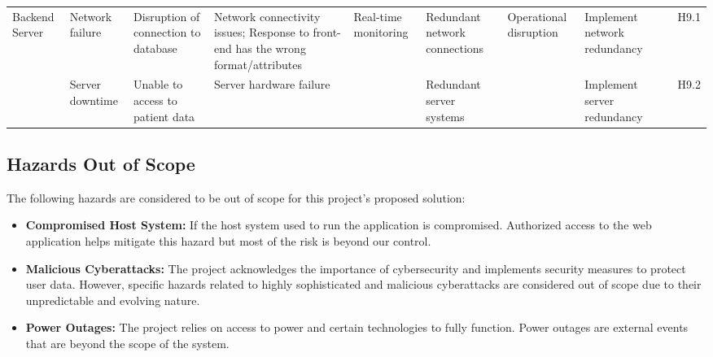 \documentclass{article}
\begin{document}
\begin{landscape}
\begin{table}[hp]
\begin{footnotesize}
\begin{tabular}{|p{1in}|p{1in}|p{1in}|p{1.5in}|p{0.6in}|p{0.5in}|p{0.3in}|p{2.5in}|p{0.2in}|p{0.2in}|}
        
        
        \hline 
        \multirow{2}{1in}{Backend Server} & Network failure & Disruption of connection to database & Network connectivity issues; Response to front-end has the wrong format/attributes & \multirow{2}{0.6in}{Real-time monitoring} & Redundant network connections & \multirow{2}{0.2in}{Operational disruption} & Implement network redundancy & & H9.1 \\
        \cline{2-4}\cline{6-6}\cline{8-8}\cline{10-10}
        & Server downtime & Unable to access to patient data & Server hardware failure & & Redundant server systems & & Implement server redundancy & & H9.2 \\
        \bottomrule
    \end{tabular}
    \end{footnotesize}
\end{table}
\end{landscape}
\restoregeometry

\subsection{Hazards Out of Scope}
The following hazards are considered to be out of scope for this project's proposed solution:
\begin{itemize}
    \item \textbf{Compromised Host System:} If the host system used to run the application is compromised. Authorized access to the web application helps mitigate this hazard but most of the risk is beyond our control.
    \item \textbf{Malicious Cyberattacks:} The project acknowledges the importance of cybersecurity and implements security measures to protect user data. However, specific hazards related to highly sophisticated and malicious cyberattacks are considered out of scope due to their unpredictable and evolving nature.
    \item \textbf{Power Outages:} The project relies on access to power and certain technologies to fully function. Power outages are external events that are beyond the scope of the system.
\end{itemize} 
\end{document}
